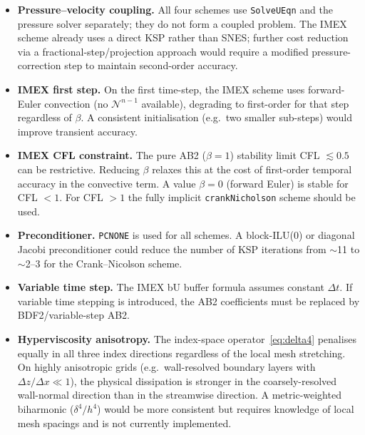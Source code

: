 \documentclass[12pt,a4paper]{article}
\newcommand{\cN}{\mathcal{N}}
\newcommand{\dt}{\Delta t}
\begin{document}
	\begin{itemize}
		\item \textbf{Pressure--velocity coupling.} All four schemes use
		\texttt{SolveUEqn} and the pressure solver separately; they do
		not form a coupled problem. The IMEX scheme already uses a direct
		KSP rather than SNES; further cost reduction via a
		fractional-step/projection approach would require a modified
		pressure-correction step to maintain second-order accuracy.
		
		\item \textbf{IMEX first step.} On the first time-step, the IMEX scheme
		uses forward-Euler convection (no $\cN^{n-1}$ available), degrading
		to first-order for that step regardless of $\beta$. A consistent
		initialisation (e.g.\ two smaller sub-steps) would improve transient
		accuracy.
		
		\item \textbf{IMEX CFL constraint.} The pure AB2 ($\beta=1$) stability
		limit CFL $\lesssim 0.5$ can be restrictive. Reducing $\beta$
		relaxes this at the cost of first-order temporal accuracy in the
		convective term. A value $\beta=0$ (forward Euler) is stable for
		CFL $<1$. For CFL $>1$ the fully implicit
		\texttt{crankNicholson} scheme should be used.
		
		\item \textbf{Preconditioner.} \texttt{PCNONE} is used for all
		schemes. A block-ILU(0) or diagonal Jacobi preconditioner could
		reduce the number of KSP iterations from $\sim$11 to $\sim$2--3
		for the Crank--Nicolson scheme.
		
		\item \textbf{Variable time step.} The IMEX bU buffer formula assumes
		constant $\dt$. If variable time stepping is introduced, the AB2
		coefficients must be replaced by BDF2/variable-step AB2.

		\item \textbf{Hyperviscosity anisotropy.} The index-space
		operator~\eqref{eq:delta4} penalises equally in all three index
		directions regardless of the local mesh stretching. On highly
		anisotropic grids (e.g.\ wall-resolved boundary layers with
		$\Delta z / \Delta x \ll 1$), the physical dissipation is
		stronger in the coarsely-resolved wall-normal direction than in
		the streamwise direction. A metric-weighted biharmonic
		($\delta^4 / h^4$) would be more consistent but requires knowledge
		of local mesh spacings and is not currently implemented.
	\end{itemize}
	
\end{document}
